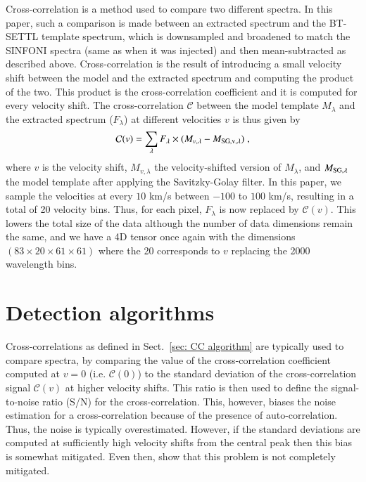 \documentclass{aa}
\begin{document}
Cross-correlation is a method used to compare two different spectra.
In this paper, such a comparison is made between an extracted spectrum and the BT-SETTL template spectrum, which is downsampled and broadened to match the SINFONI spectra (same as when it was injected) and then mean-subtracted as described above.
Cross-correlation is the result of introducing a small velocity shift between the model and the extracted spectrum and computing the product of the two.
This product is the cross-correlation coefficient and it is computed for every velocity shift.
The cross-correlation $\mathcal{C}$ between the model template $M_{\lambda}$ and the extracted spectrum ($F_{\lambda}$) at different velocities $v$ is thus given by
\begin{equation}
    \mathcal{C}(v) = \sum\limits_{\lambda}F_{\rm{\lambda}}\times (M_{v,\lambda}-M_{\rm{SG},v,\lambda})  \; ,
    \label{eq:CC equation}
\end{equation}
where $v$ is the velocity shift, $M_{v,\lambda}$ the velocity-shifted version of $M_{\lambda}$, and $M_{\rm{SG},\lambda}$ the model template after applying the Savitzky-Golay filter.
In this paper, we sample the velocities at every $10$ km/s between $-100$ to $100$ km/s, resulting in a total of 20 velocity bins. Thus, for each pixel, $F_\lambda$ is now replaced by $\mathcal{C}(v)$. This lowers the total size of the data although the number of data dimensions remain the same, and we have a 4D tensor once again with the dimensions $\left(83\times20\times61\times61\right)$ where the 20 corresponds to $v$ replacing the 2000 wavelength bins.

\section{Detection algorithms}
\label{sec:mapbased}


Cross-correlations as defined in Sect.~\ref{sec: CC algorithm} are typically used to compare spectra, by comparing the value of the cross-correlation coefficient computed at $v=0$ (i.e. $\mathcal{C}(0)$) to the standard deviation of the cross-correlation signal $\mathcal{C}(v)$ at higher velocity shifts.
This ratio is then used to define the signal-to-noise ratio (S/N) for the cross-correlation.
This, however, biases the noise estimation for a cross-correlation because of the presence of auto-correlation.
Thus, the noise is typically overestimated. %
However, if the standard deviations are computed at sufficiently high velocity shifts from the central peak \citep[e.g. for $|v|\ge 250$ km/s in][]{2018AHoeijmakersMM} then this bias is somewhat mitigated.
Even then, \citet{ruffio2019radial} show that this problem is not completely mitigated. 
\end{document}
